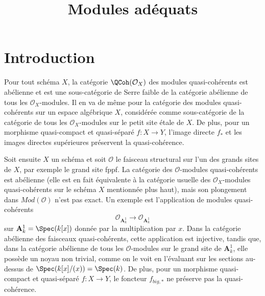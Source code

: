 

%


\title{Modules adéquats}


\maketitle

\label{section-phantom}

\tableofcontents

\section{Introduction}
\label{section-introduction}

\noindent
Pour tout schéma $X$, la catégorie $\QCoh(\mathcal{O}_X)$
des modules quasi-cohérents est abélienne et est une sous-catégorie
de Serre faible de la catégorie abélienne de tous les $\mathcal{O}_X$-modules.
Il en va de même pour la catégorie des modules quasi-cohérents sur
un espace algébrique $X$, considérée comme sous-catégorie de la catégorie
de tous les $\mathcal{O}_X$-modules sur le petit site étale de $X$.
De plus, pour un morphisme quasi-compact et quasi-séparé
$f : X \to Y$, l'image directe $f_*$ et les images directes supérieures
préservent la quasi-cohérence.

\medskip\noindent
Soit ensuite $X$ un schéma et soit $\mathcal{O}$ le faisceau structural
sur l'un des grands sites de $X$, par exemple le grand site fppf.
La catégorie des $\mathcal{O}$-modules quasi-cohérents est abélienne
(elle est en fait équivalente à la catégorie usuelle des
$\mathcal{O}_X$-modules quasi-cohérents sur le schéma $X$ mentionnée plus haut),
mais son plongement dans $\textit{Mod}(\mathcal{O})$ n'est pas exact.
Un exemple est l'application de modules quasi-cohérents
$$
\mathcal{O}_{\mathbf{A}^1_k}
\longrightarrow
\mathcal{O}_{\mathbf{A}^1_k}
$$
sur $\mathbf{A}^1_k = \Spec(k[x])$ donnée par la multiplication par $x$.
Dans la catégorie abélienne des faisceaux quasi-cohérents, cette application
est injective, tandis que, dans la catégorie abélienne de tous les
$\mathcal{O}$-modules sur le grand site de $\mathbf{A}^1_k$, elle possède
un noyau non trivial, comme on le voit en l'évaluant sur les sections au-dessus
de $\Spec(k[x]/(x)) = \Spec(k)$. De plus, pour un morphisme
quasi-compact et quasi-séparé $f : X \to Y$, le foncteur $f_{big, *}$
ne préserve pas la quasi-cohérence.

